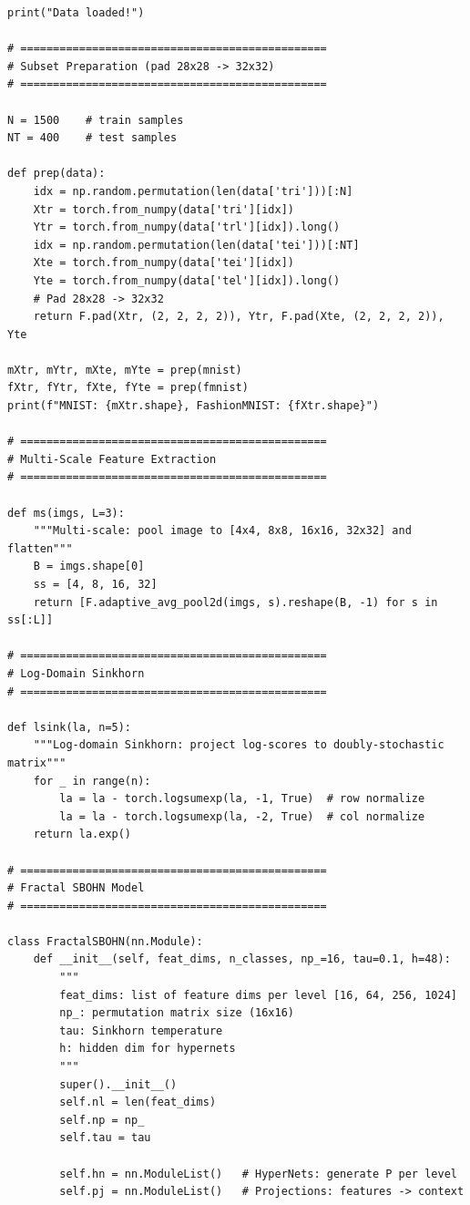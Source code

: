 \documentclass[11pt,a4paper]{report}
\begin{document}
\begin{small}
\begin{verbatim}
print("Data loaded!")

# ===============================================
# Subset Preparation (pad 28x28 -> 32x32)
# ===============================================

N = 1500    # train samples
NT = 400    # test samples

def prep(data):
    idx = np.random.permutation(len(data['tri']))[:N]
    Xtr = torch.from_numpy(data['tri'][idx])
    Ytr = torch.from_numpy(data['trl'][idx]).long()
    idx = np.random.permutation(len(data['tei']))[:NT]
    Xte = torch.from_numpy(data['tei'][idx])
    Yte = torch.from_numpy(data['tel'][idx]).long()
    # Pad 28x28 -> 32x32
    return F.pad(Xtr, (2, 2, 2, 2)), Ytr, F.pad(Xte, (2, 2, 2, 2)), Yte

mXtr, mYtr, mXte, mYte = prep(mnist)
fXtr, fYtr, fXte, fYte = prep(fmnist)
print(f"MNIST: {mXtr.shape}, FashionMNIST: {fXtr.shape}")

# ===============================================
# Multi-Scale Feature Extraction
# ===============================================

def ms(imgs, L=3):
    """Multi-scale: pool image to [4x4, 8x8, 16x16, 32x32] and flatten"""
    B = imgs.shape[0]
    ss = [4, 8, 16, 32]
    return [F.adaptive_avg_pool2d(imgs, s).reshape(B, -1) for s in ss[:L]]

# ===============================================
# Log-Domain Sinkhorn
# ===============================================

def lsink(la, n=5):
    """Log-domain Sinkhorn: project log-scores to doubly-stochastic matrix"""
    for _ in range(n):
        la = la - torch.logsumexp(la, -1, True)  # row normalize
        la = la - torch.logsumexp(la, -2, True)  # col normalize
    return la.exp()

# ===============================================
# Fractal SBOHN Model
# ===============================================

class FractalSBOHN(nn.Module):
    def __init__(self, feat_dims, n_classes, np_=16, tau=0.1, h=48):
        """
        feat_dims: list of feature dims per level [16, 64, 256, 1024]
        np_: permutation matrix size (16x16)
        tau: Sinkhorn temperature
        h: hidden dim for hypernets
        """
        super().__init__()
        self.nl = len(feat_dims)
        self.np = np_
        self.tau = tau

        self.hn = nn.ModuleList()   # HyperNets: generate P per level
        self.pj = nn.ModuleList()   # Projections: features -> context


\end{verbatim}
\end{small}
\end{document}
